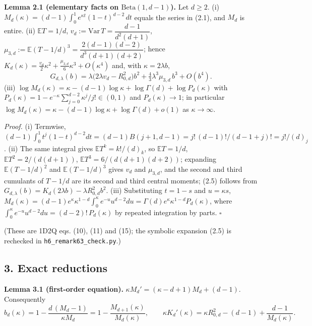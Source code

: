 \documentclass[
  11pt,
  a4paper,
]{article}
\begin{document}
\textbf{Lemma 2.1 (elementary facts on \(\mathrm{Beta}(1,\allowbreak{}d-1)\)).} Let
\(d\ge2\). (i) \(M_d(\kappa)=(d-1)\int_0^1e^{\kappa t}(1-t)^{d-2}\,\allowbreak{}dt\)
equals the series in (2.1), and \(M_d\) is entire. (ii)
\(\mathbb ET=1/d\), \(v_d:=\mathrm{Var}\,\allowbreak{}T=\dfrac{d-1}{d^2(d+1)}\),
\(\mu_{3,\allowbreak{}d}:=\mathbb E(T-1/d)^3=\dfrac{2(d-1)(d-2)}{d^3(d+1)(d+2)}\);
hence
\(K_d(\kappa)=\frac{v_d}{2}\kappa^2+\frac{\mu_{3,\allowbreak{}d}}{6}\kappa^3+O(\kappa^4)\)
and, with \(\kappa=2\lambda b\),
\[G_{d,\lambda}(b)=\lambda\big(2\lambda v_d-R_{0,d}^2\big)b^2+\tfrac43\lambda^3\mu_{3,d}\,b^3+O(b^4). \tag{2.5}\]
(iii)
\(\log M_d(\kappa)=\kappa-(d-1)\log\kappa+\log\Gamma(d)+\log P_d(\kappa)\)
with \(P_d(\kappa)=1-e^{-\kappa}\sum_{j=0}^{d-2}\kappa^j/j!\in(0,\allowbreak{}1)\)
and \(P_d(\kappa)\to1\); in particular
\(\log M_d(\kappa)=\kappa-(d-1)\log\kappa+\log\Gamma(d)+o(1)\) as
\(\kappa\to\infty\).

\emph{Proof.} (i) Termwise,
\((d-1)\int_0^1t^j(1-t)^{d-2}dt=(d-1)B(j+1,\allowbreak{}d-1)=j!\,\allowbreak{}(d-1)!/(d-1+j)!=j!/(d)_j\).
(ii) The same integral gives \(\mathbb ET^k=k!/(d)_k\), so
\(\mathbb ET=1/d\), \(\mathbb ET^2=2/(d(d+1))\),
\(\mathbb ET^3=6/(d(d+1)(d+2))\); expanding \(\mathbb E(T-1/d)^2\) and
\(\mathbb E(T-1/d)^3\) gives \(v_d\) and \(\mu_{3,\allowbreak{}d}\), and the second
and third cumulants of \(T-1/d\) are its second and third central
moments; (2.5) follows from
\(G_{d,\allowbreak{}\lambda}(b)=K_d(2\lambda b)-\lambda R_{0,\allowbreak{}d}^2b^2\). (iii)
Substituting \(t=1-s\) and \(u=\kappa s\),
\(M_d(\kappa)=(d-1)e^\kappa\kappa^{1-d}\int_0^\kappa e^{-u}u^{d-2}du=\Gamma(d)e^\kappa\kappa^{1-d}P_d(\kappa)\),
where \(\int_0^\kappa e^{-u}u^{d-2}du=(d-2)!\,\allowbreak{}P_d(\kappa)\) by repeated
integration by parts. \(\square\)

(These are 1D2Q eqs. (10), (11) and (15); the symbolic expansion (2.5)
is rechecked in {\small\texttt{h6\_\allowbreak{}remark63\_\allowbreak{}check.\allowbreak{}py}}.)

\subsection{3. Exact reductions}\label{exact-reductions}

\textbf{Lemma 3.1 (first-order equation).}
\(\kappa M_d'=(\kappa-d+1)M_d+(d-1)\). Consequently
\[b_d(\kappa)=1-\frac{d\,(M_d-1)}{\kappa M_d}=1-\frac{M_{d+1}(\kappa)}{M_d(\kappa)},\qquad \kappa K_d'(\kappa)=\kappa R_{0,d}^2-(d-1)+\frac{d-1}{M_d(\kappa)}. \tag{3.1}\]
\end{document}
